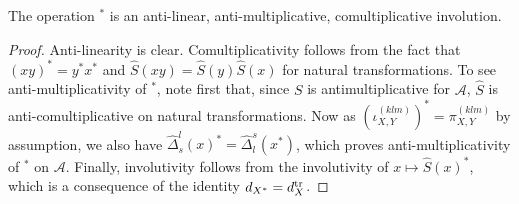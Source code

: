 \begin{Lem} The operation $^*$ is an anti-linear, anti-multiplicative, comultiplicative involution.
\end{Lem}

\begin{proof} Anti-linearity is clear. Comultiplicativity follows from the fact that $(xy)^* = y^*x^*$ and $\hat{S}(xy) = \hat{S}(y)\hat{S}(x)$ for natural transformations. To see anti-multiplicativity of $^*$, note first that, since $S$ is antimultiplicative for $\mathscr{A}$, $\hat{S}$ is anti-comultiplicative on natural transformations. Now as $(\iota_{X,Y}^{(klm)})^* = \pi_{X,Y}^{(klm)}$ by assumption, we also have $\hat{\Delta}^l_s(x)^* = \hat{\Delta}^s_l(x^*)$, which proves anti-multiplicativity of $^*$ on $\mathscr{A}$.  Finally, involutivity follows from the involutivity of $x\mapsto \hat{S}(x)^*$, which is a consequence of the identity $d_{X^*} = d_X^{\operatorname{\mathrm{tr}}}$. %
\end{proof}

